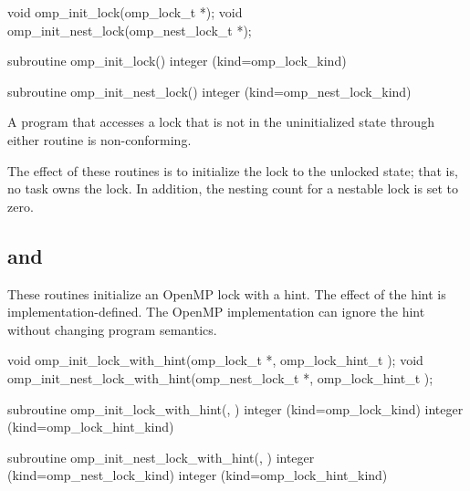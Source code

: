 \format
\ccppspecificstart
\begin{boxedcode}
void omp\_init\_lock(omp\_lock\_t *);
void omp\_init\_nest\_lock(omp\_nest\_lock\_t *);
\end{boxedcode}
\ccppspecificend

\fortranspecificstart
\begin{boxedcode}
subroutine omp\_init\_lock()
integer (kind=omp\_lock\_kind) 

subroutine omp\_init\_nest\_lock()
integer (kind=omp\_nest\_lock\_kind) 
\end{boxedcode}
\fortranspecificend

\constraints
A program that accesses a lock that is not in the uninitialized state through either routine 
is non-conforming.

\effect
The effect of these routines is to initialize the lock to the unlocked state; that is, no task 
owns the lock. In addition, the nesting count for a nestable lock is set to zero.











\subsection[\code{omp\_init\_lock\_with\_hint} and \code{omp\_init\_nest\_lock\_with\_hint}]{ and \\}
\label{subsec:omp_init_lock_with_hint and omp_init_nest_lock_with_hint}
\summary
These routines initialize an OpenMP lock with a hint.  
The effect of the hint is implementation-defined. The OpenMP implementation
can ignore the hint without changing program semantics.


\format
\ccppspecificstart
\begin{boxedcode}
void omp\_init\_lock\_with\_hint(omp\_lock\_t *, 
                             omp\_lock\_hint\_t );
void omp\_init\_nest\_lock\_with\_hint(omp\_nest\_lock\_t *, 
                                  omp\_lock\_hint\_t );
\end{boxedcode}
\ccppspecificend

\fortranspecificstart
\begin{boxedcode}
subroutine omp\_init\_lock\_with\_hint(, )
integer (kind=omp\_lock\_kind) 
integer (kind=omp\_lock\_hint\_kind) 

subroutine omp\_init\_nest\_lock\_with\_hint(, )
integer (kind=omp\_nest\_lock\_kind) 
integer (kind=omp\_lock\_hint\_kind) 
\end{boxedcode}
\fortranspecificend

